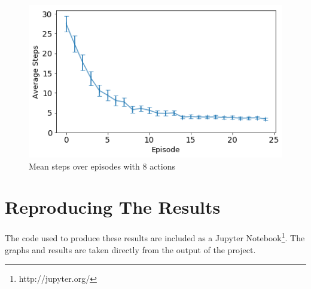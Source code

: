 \documentclass[11pt,journal,transmag,final]{IEEEtran}
\begin{document}
    \begin{figure}
        \begin{center}
            \includegraphics[width=\linewidth,keepaspectratio]{figures/8-mean-steps.png}
            \caption{Mean steps over episodes with 8 actions}
            \label{fig:8-actions:mean-steps}
        \end{center}
    \end{figure}

    \section{Reproducing The Results}

    The code used to produce these results are included as a Jupyter Notebook\footnote{http://jupyter.org/}. The graphs and results are taken directly from the output of the project.
\end{document}
